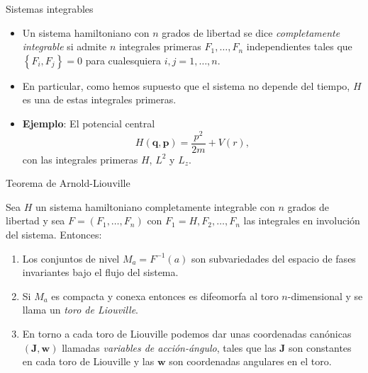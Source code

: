 \documentclass[aspectratio=169,mathserif]{beamer}
\newcommand{\vect}[1]{\mathbf{#1}}
\begin{document}
\begin{frame}{Sistemas integrables}
  \begin{itemize}
    \item Un sistema hamiltoniano con $n$ grados de libertad se dice \emph{completamente integrable} si admite $n$ integrales primeras $F_1,\dots,F_n$ independientes tales que $\left\{ F_i, F_j \right\}=0$ para cualesquiera $i,j=1,\dots,n$.
    \item En particular, como hemos supuesto que el sistema no depende del tiempo, $H$ es una de estas integrales primeras.
    \item \textbf{Ejemplo}: El potencial central
      \begin{equation*}
	H(\vect{q},\vect{p})=\frac{p^2}{2m}+V(r),
      \end{equation*}
      con las integrales primeras $H$, $L^2$ y $L_z$.
  \end{itemize}
\end{frame}

\begin{frame}{Teorema de Arnold-Liouville}
  \begin{theorem}
    Sea $H$ un sistema hamiltoniano completamente integrable con $n$ grados de libertad y sea $F=(F_1,\dots,F_n)$ con $F_1=H,F_2,\dots,F_n$ las integrales en involución del sistema. Entonces:
    \begin{enumerate}
      \item Los conjuntos de nivel $M_a=F^{-1}(a)$ son subvariedades del espacio de fases invariantes bajo el flujo del sistema.
      \item Si $M_a$ es compacta y conexa entonces es difeomorfa al toro $n$-dimensional y se llama un \emph{toro de Liouville}.
      \item En torno a cada toro de Liouville podemos dar unas coordenadas canónicas $(\vect{J},\vect{w})$ llamadas \emph{variables de acción-ángulo}, tales que las $\vect{J}$ son constantes en cada toro de Liouville y las $\vect{w}$ son coordenadas angulares en el toro. 
    \end{enumerate}
  \end{theorem}
\end{frame}
\end{document}
